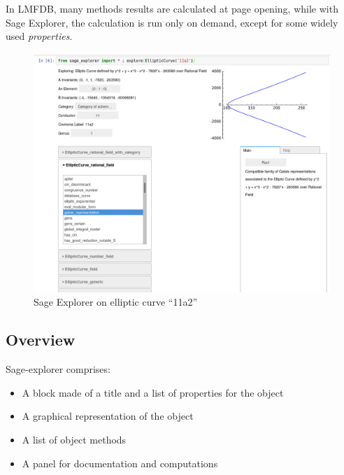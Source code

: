 \documentclass{deliverablereport}
\begin{document}

In LMFDB, many methods results are calculated at page opening, while
with Sage Explorer, the calculation is run only on demand, except for
some widely used \emph{properties}.

\begin{figure}[h]
  \begin{center}
    \includegraphics[width=\textwidth]{images/SageExplorer-11a2}
  \end{center}
  \caption{Sage Explorer on elliptic curve ``11a2''}
  \label{fig:lmfdb}
\end{figure}


\subsection{Overview}

Sage-explorer comprises:

\begin{itemize}
  \item A block made of a title and a list of properties for the object
  \item A graphical representation of the object
  \item A list of object methods
  \item A panel for documentation and computations
\end{itemize}
\end{document}
